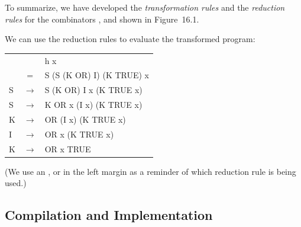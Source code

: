 \noindent
To summarize, we have developed the \textit{transformation rules} and the \textit{reduction
    rules} for the combinators ,  and  shown in Figure~16.1.


We can use the reduction rules to evaluate the transformed program:
\begin{mlcoded}
    \begin{tabular}{@{}l@{\qquad }c@{\quad}l@{}}
        & & h x \\
        & $=$ & S (S (K OR) I) (K TRUE) x \\
        S & $\rightarrow$ & S (K OR) I x (K TRUE x) \\
        S & $\rightarrow$ & K OR x (I x) (K TRUE x) \\
        K & $\rightarrow$ & OR (I x) (K TRUE x) \\
        I & $\rightarrow$ & OR x (K TRUE x) \\
        K & $\rightarrow$ & OR x TRUE
    \end{tabular}
\end{mlcoded}
(We use an ,  or  in the left margin as a reminder of which reduction rule is
being used.)

\subsection{Compilation and Implementation}

